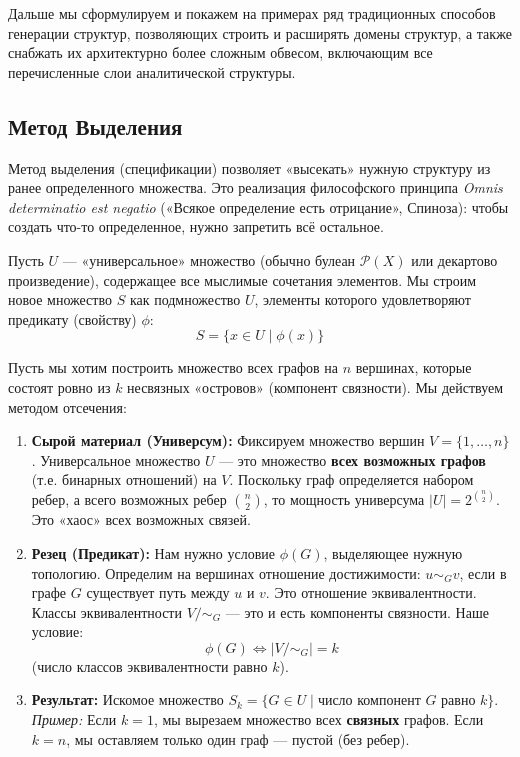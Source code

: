 \documentclass[11pt, a4paper]{extarticle}
\newcommand{\Pcal}{{\mathcal P}}
\begin{document}
Дальше мы сформулируем и покажем на примерах ряд традиционных способов генерации структур, позволяющих строить и расширять домены структур, а также снабжать их архитектурно более сложным обвесом, включающим все перечисленные слои аналитической структуры.

\subsection{Метод Выделения}

    Метод выделения (спецификации) позволяет «высекать» нужную структуру из ранее определенного множества.
    Это реализация философского принципа \textit{Omnis determinatio est negatio} («Всякое определение есть отрицание», Спиноза): чтобы создать что-то определенное, нужно запретить всё остальное.
    
    \begin{definition}
    Пусть $U$ — «универсальное» множество (обычно булеан $\Pcal(X)$ или декартово произведение), содержащее все мыслимые сочетания элементов.
    Мы строим новое множество $S$ как подмножество $U$, элементы которого удовлетворяют предикату (свойству) $\phi$:
    $$ S = \{x \in U \mid \phi(x)\} $$
    \end{definition}
    
    \begin{example}
        Пусть мы хотим построить множество всех графов на $n$ вершинах, которые состоят ровно из $k$ несвязных «островов» (компонент связности).
        Мы действуем методом отсечения:
        
        \begin{enumerate}
            \item \textbf{Сырой материал (Универсум):} 
            Фиксируем множество вершин $V = \{1, \dots, n\}$.
            Универсальное множество $U$ — это множество \textbf{всех возможных графов} (т.е. бинарных отношений) на $V$.
            Поскольку граф определяется набором ребер, а всего возможных ребер $\binom{n}{2}$, то мощность универсума $|U| = 2^{\binom{n}{2}}$. Это «хаос» всех возможных связей.
        
            \item \textbf{Резец (Предикат):} 
            Нам нужно условие $\phi(G)$, выделяющее нужную топологию.
            Определим на вершинах отношение достижимости: $u \sim_G v$, если в графе $G$ существует путь между $u$ и $v$. Это отношение эквивалентности.
            Классы эквивалентности $V / \sim_G$ — это и есть компоненты связности.
            Наше условие:
            $$ \phi(G) \iff |V / \sim_G| = k $$
            (число классов эквивалентности равно $k$).
        
            \item \textbf{Результат:} 
            Искомое множество $S_k = \{G \in U \mid \text{число компонент } G \text{ равно } k\}$.
            \textit{Пример:} Если $k=1$, мы вырезаем множество всех \textbf{связных} графов. Если $k=n$, мы оставляем только один граф — пустой (без ребер).
        \end{enumerate}
        \end{example}
    
\end{document}

